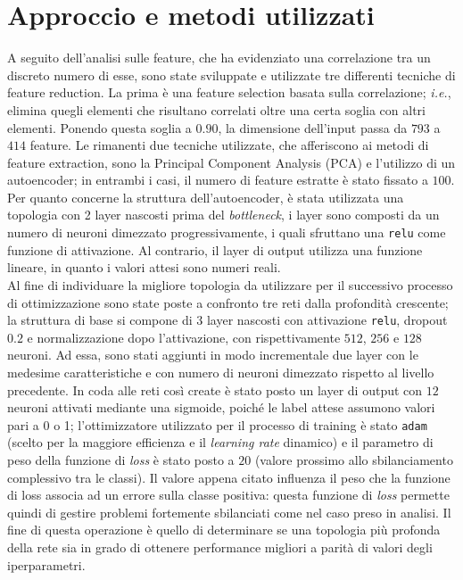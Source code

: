 \section{Approccio e metodi utilizzati}
A seguito dell'analisi sulle feature, che ha evidenziato una correlazione tra un discreto numero di esse, sono state sviluppate e utilizzate tre differenti tecniche di feature reduction. 
La prima è una feature selection basata sulla correlazione; \textit{i.e.}, elimina quegli elementi che risultano correlati oltre una certa soglia con altri elementi. 
Ponendo questa soglia a $0.90$, la dimensione dell'input passa da $793$ a $414$ feature.
Le rimanenti due tecniche utilizzate, che afferiscono ai metodi di feature extraction, sono la Principal Component Analysis (PCA) e l'utilizzo di un autoencoder; in entrambi i casi, il numero di feature estratte è stato fissato a $100$.
Per quanto concerne la struttura dell'autoencoder, è stata utilizzata una topologia con 2 layer nascosti prima del \textit{bottleneck}, i layer sono composti da un numero di neuroni dimezzato progressivamente, i quali sfruttano una \texttt{relu} come funzione di attivazione. 
Al contrario, il layer di output utilizza una funzione lineare, in quanto i valori attesi sono numeri reali.\\
Al fine di individuare la migliore topologia da utilizzare per il successivo processo di ottimizzazione sono state poste a confronto tre reti dalla profondità crescente; la struttura di base si compone di $3$ layer nascosti con attivazione \texttt{relu}, dropout $0.2$ e normalizzazione dopo l'attivazione, con rispettivamente $512$, $256$ e $128$ neuroni. 
Ad essa, sono stati aggiunti in modo incrementale due layer con le medesime caratteristiche e con numero di neuroni dimezzato rispetto al livello precedente. %
In coda alle reti così create è stato posto un layer di output con $12$ neuroni attivati mediante una sigmoide, poiché le label attese assumono valori pari a 0 o 1; l'ottimizzatore utilizzato per il processo di training è stato \texttt{adam} (scelto per la maggiore efficienza e il \textit{learning rate} dinamico) e il parametro di peso della funzione di \textit{loss} è stato posto a $20$ (valore prossimo allo sbilanciamento complessivo tra le classi). 
Il valore appena citato influenza il peso che la funzione di loss associa ad un errore sulla classe positiva: questa funzione di \textit{loss} permette quindi di gestire problemi fortemente sbilanciati come nel caso preso in analisi.
Il fine di questa operazione è quello di determinare se una topologia più profonda della rete sia in grado di ottenere performance migliori a parità di valori degli iperparametri.

